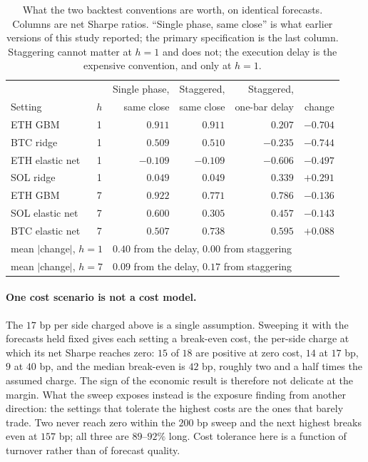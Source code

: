 \documentclass{article}
\theoremstyle{plain}
\theoremstyle{definition}
\begin{document}
\begin{table}[t]
  \centering
  \caption{What the two backtest conventions are worth, on identical forecasts. Columns are
  net Sharpe ratios. ``Single phase, same close'' is what earlier versions of this study
  reported; the primary specification is the last column. Staggering cannot matter at $h=1$
  and does not; the execution delay is the expensive convention, and only at $h=1$.}
  \label{tab:execution}
  \small
  \begin{tabular}{lcrrrr}
    \toprule
    & & Single phase, & Staggered, & Staggered, & \\
    Setting & $h$ & same close & same close & one-bar delay & change \\
    \midrule
    ETH GBM         & 1 & $0.911$ & $0.911$ & $0.207$ & $-0.704$ \\
    BTC ridge       & 1 & $0.509$ & $0.510$ & $-0.235$ & $-0.744$ \\
    ETH elastic net & 1 & $-0.109$ & $-0.109$ & $-0.606$ & $-0.497$ \\
    SOL ridge       & 1 & $0.049$ & $0.049$ & $0.339$ & $+0.291$ \\
    \midrule
    ETH GBM         & 7 & $0.922$ & $0.771$ & $0.786$ & $-0.136$ \\
    SOL elastic net & 7 & $0.600$ & $0.305$ & $0.457$ & $-0.143$ \\
    BTC elastic net & 7 & $0.507$ & $0.738$ & $0.595$ & $+0.088$ \\
    \midrule
    \multicolumn{2}{l}{mean $|$change$|$, $h=1$} & \multicolumn{4}{l}{$0.40$ from the delay, $0.00$ from staggering} \\
    \multicolumn{2}{l}{mean $|$change$|$, $h=7$} & \multicolumn{4}{l}{$0.09$ from the delay, $0.17$ from staggering} \\
    \bottomrule
  \end{tabular}
\end{table}

\paragraph{One cost scenario is not a cost model.} The $17$ bp per side charged above is a
single assumption. Sweeping it with the forecasts held fixed gives each setting a break-even
cost, the per-side charge at which its net Sharpe reaches zero: $15$ of $18$ are positive at
zero cost, $14$ at $17$ bp, $9$ at $40$ bp, and the median break-even is $42$ bp, roughly
two and a half times the assumed charge. The sign of the economic result is therefore not
delicate at the margin. What the sweep exposes instead is the exposure finding from another
direction: the settings that tolerate the highest costs are the ones that barely trade. Two
never reach zero within the $200$ bp sweep and the next highest breaks even at $157$ bp; all
three are $89$--$92\%$ long. Cost tolerance
here is a function of turnover rather than of forecast quality.
\end{document}

